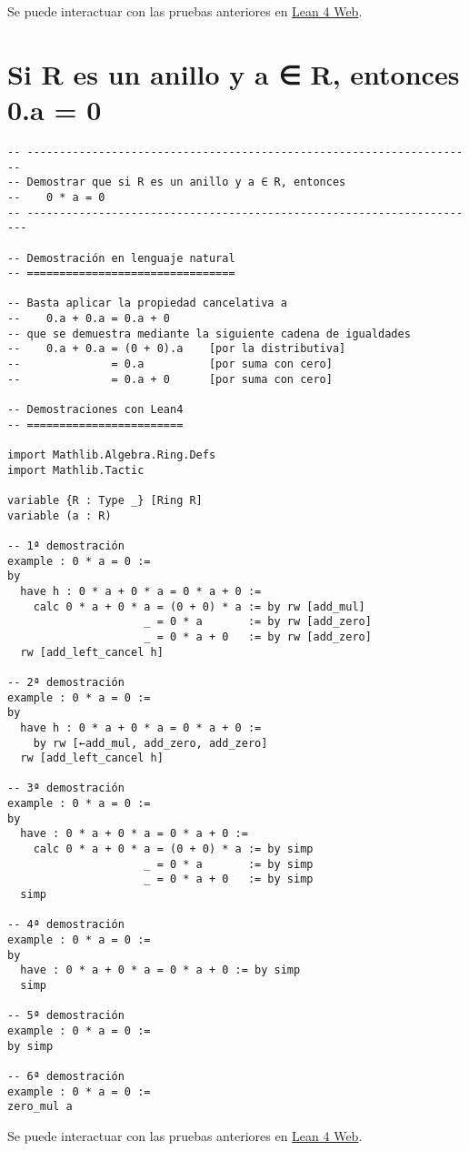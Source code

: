 Se puede interactuar con las pruebas anteriores en \href{https://lean.math.hhu.de/\#url=https://raw.githubusercontent.com/jaalonso/Calculemus2/main/src/Multiplicacion\_por\_cero.lean}{Lean 4 Web}.

\section{Si R es un anillo y a ∈ R, entonces 0.a = 0}
\label{sec:org6932844}
\begin{verbatim}
-- ---------------------------------------------------------------------
-- Demostrar que si R es un anillo y a ∈ R, entonces
--    0 * a = 0
-- ----------------------------------------------------------------------

-- Demostración en lenguaje natural
-- ================================

-- Basta aplicar la propiedad cancelativa a
--    0.a + 0.a = 0.a + 0
-- que se demuestra mediante la siguiente cadena de igualdades
--    0.a + 0.a = (0 + 0).a    [por la distributiva]
--              = 0.a          [por suma con cero]
--              = 0.a + 0      [por suma con cero]

-- Demostraciones con Lean4
-- ========================

import Mathlib.Algebra.Ring.Defs
import Mathlib.Tactic

variable {R : Type _} [Ring R]
variable (a : R)

-- 1ª demostración
example : 0 * a = 0 :=
by
  have h : 0 * a + 0 * a = 0 * a + 0 :=
    calc 0 * a + 0 * a = (0 + 0) * a := by rw [add_mul]
                     _ = 0 * a       := by rw [add_zero]
                     _ = 0 * a + 0   := by rw [add_zero]
  rw [add_left_cancel h]

-- 2ª demostración
example : 0 * a = 0 :=
by
  have h : 0 * a + 0 * a = 0 * a + 0 :=
    by rw [←add_mul, add_zero, add_zero]
  rw [add_left_cancel h]

-- 3ª demostración
example : 0 * a = 0 :=
by
  have : 0 * a + 0 * a = 0 * a + 0 :=
    calc 0 * a + 0 * a = (0 + 0) * a := by simp
                     _ = 0 * a       := by simp
                     _ = 0 * a + 0   := by simp
  simp

-- 4ª demostración
example : 0 * a = 0 :=
by
  have : 0 * a + 0 * a = 0 * a + 0 := by simp
  simp

-- 5ª demostración
example : 0 * a = 0 :=
by simp

-- 6ª demostración
example : 0 * a = 0 :=
zero_mul a
\end{verbatim}
Se puede interactuar con las pruebas anteriores en \href{https://lean.math.hhu.de/\#url=https://raw.githubusercontent.com/jaalonso/Calculemus2/main/src/Multiplicacion\_por\_cero\_izquierda.lean}{Lean 4 Web}.

